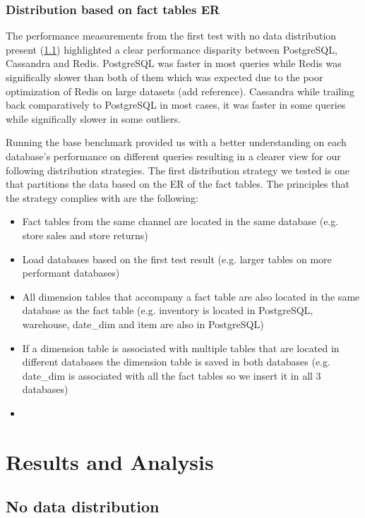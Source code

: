 \documentclass[conference]{IEEEtran}
\begin{document}
\subsubsection{Distribution based on fact tables ER}

The performance measurements from the first test with no data distribution present (\ref{sec:no-data-distribution}) highlighted a clear performance disparity between PostgreSQL, Cassandra and Redis. PostgreSQL was faster in most queries while Redis was significally slower than both of them which was expected due to the poor optimization of Redis on large datasets (add reference). Cassandra while trailing back comparatively to PostgreSQL in most cases, it was faster in some queries while significally slower in some outliers.  %

Running the base benchmark provided us with a better understanding on each database's performance on different queries resulting in a clearer view for our following distribution strategies. The first distribution strategy we tested is one that partitions the data based on the ER of the fact tables.
The principles that the strategy complies with are the following:
\begin{itemize}
    \item \textbf{} Fact tables from the same channel are located in the same database (e.g. store sales and store returns)
    \item \textbf{} Load databases based on the first test result (e.g. larger tables on more performant databases)
    \item \textbf{} All dimension tables that accompany a fact table are also located in the same database as the fact table (e.g. inventory is located in PostgreSQL, warehouse, date\_dim and item are also in PostgreSQL)
    \item \textbf{} If a dimension table is associated with multiple tables that are located in different databases the dimension table is saved in both databases (e.g. date\_dim is associated with all the fact tables so we insert it in all 3 databases)
    \item \textbf{}
\end{itemize}

\section{Results and Analysis}

\subsection{No data distribution}
\label{sec:no-data-distribution}
\end{document}
